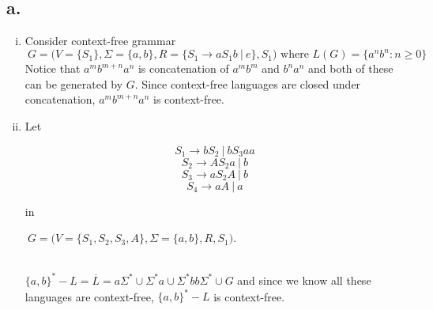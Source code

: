 \documentclass[12pt]{article}
\begin{document}
\subsection*{a.}
\begin{enumerate}[(i)]
\item 
	\qquad Consider context-free grammar
		$$\ G = \Big(V=\{S_1\}, \Sigma=\{a, b\}, R = \{S_1 \rightarrow aS_1b\ |\ e\}, S_1\Big) \text{ where } L(G) = \{a^nb^n : n\geq0\}$$
	\qquad Notice that $a^mb^{m+n}a^n$ is concatenation of $a^mb^m$ and $b^na^n$ and both of these can be generated by $G$. Since context-free languages are closed under concatenation, $a^mb^{m+n}a^n$ is context-free.
\item 
	Let
	\begin{minipage}{0.4\textwidth}
		$$S_1 \rightarrow bS_2\ |\ bS_3aa$$
		$$S_2 \rightarrow AS_2a\ |\ b$$
		$$S_3 \rightarrow aS_2A\ |\ b$$
		$$S_4 \rightarrow aA\ |\ a$$
	\end{minipage}
	in 
	\begin{minipage}{0.5\textwidth}
		$\ G = \Big(V=\{S_1, S_2, S_3, A\}, \Sigma=\{a, b\}, R, S_1\Big)$.
	\end{minipage}\\

	$\{a,b\}^*-L = \overline{L} = a\Sigma^* \cup \Sigma^*a \cup \Sigma^*bb\Sigma^* \cup G$ and since we know all these languages are context-free, $\{a,b\}^*-L$ is context-free.
\end{enumerate}
\end{document}
